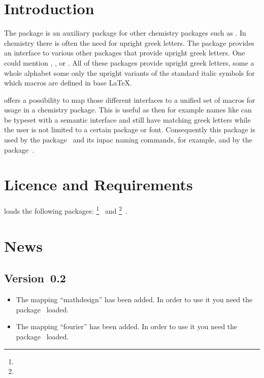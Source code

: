 \documentclass[load-preamble+]{cnltx-doc}
\begin{document}
\section{Introduction}
The \chemgreek{} package is an auxiliary package for other chemistry packages
such as .  In chemistry there is often the need for upright
greek letters.  The \chemgreek{} package provides an interface to various
other packages that provide upright greek letters.  One could mention
, ,  or .  All of these
packages provide upright greek letters, some a whole alphabet some only the
upright variants of the standard italic symbols for which macros are defined
in base \LaTeX.

\chemgreek{} offers a possibility to map those different interfaces to a
unified set of macros for usage in a chemistry package.  This is useful as
then for example names like  can be typeset
with a semantic interface and still have matching greek letters while the user
is not limited to a certain package or font.  Consequently this package is
used by the  package~\cite{pkg:chemmacros} and its \acs{iupac}
naming commands, for example, and by the 
package~\cite{pkg:chemnum}.

\section{Licence and Requirements}
\license

\chemgreek{} loads the following packages:
\footnote{}~\cite{bnd:l3kernel} and
\footnote{}~\cite{bnd:l3packages}.

\section{News}
\subsection{Version~0.2}
\begin{itemize}
  \item The mapping ``mathdesign'' has been added.  In order to use it you
    need the  package~\cite{pkg:mathdesign} loaded.
  \item The mapping ``fourier'' has been added.  In order to use it you
    need the  package~\cite{pkg:fourier} loaded.
\end{itemize}
\end{document}
